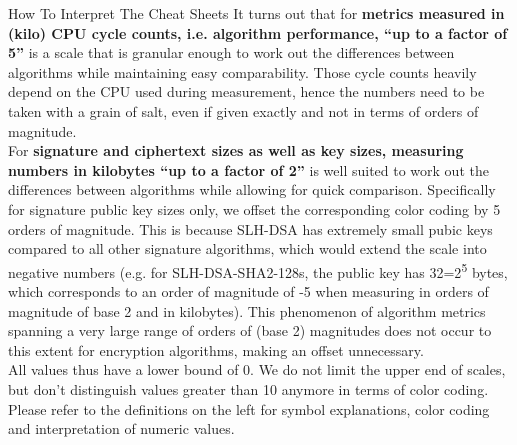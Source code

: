 \begin{minipage}[t]{0.58\textwidth}
\begin{algorithmbox}{How To Interpret The Cheat Sheets}
        It turns out that for {\bfseries metrics measured in (kilo) CPU cycle counts, i.e. algorithm performance, ``up to a factor of 5''} is a scale that is granular enough to work out the differences between algorithms while maintaining easy comparability. Those cycle counts heavily depend on the CPU used during measurement, hence the numbers need to be taken with a grain of salt, even if given exactly and not in terms of orders of magnitude.\\[\baselineskip]

        For {\bfseries signature and ciphertext sizes as well as key sizes, measuring numbers in kilobytes ``up to a factor of 2''} is well suited to work out the differences between algorithms while allowing for quick comparison. Specifically for signature public key sizes only, we offset the corresponding color coding by 5 orders of magnitude. This is because SLH-DSA has extremely small pubic keys compared to all other signature algorithms, which would extend the scale into negative numbers (e.g. for SLH-DSA-SHA2-128s, the public key has 32=2\textsuperscript{5} bytes, which corresponds to an order of magnitude of -5 when measuring in orders of magnitude of base 2 and in kilobytes). This phenomenon of algorithm metrics spanning a very large range of orders of (base 2) magnitudes does not occur to this extent for encryption algorithms, making an offset unnecessary.\\[\baselineskip]

        All values thus have a lower bound of 0. We do not limit the upper end of scales, but don't distinguish values greater than 10 anymore in terms of color coding. Please refer to the definitions on the left for symbol explanations, color coding and interpretation of numeric values.
    \end{algorithmbox}
\end{minipage}
